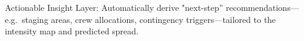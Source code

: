 \documentclass[conference]{IEEEtran}
\begin{document}
Actionable Insight Layer: Automatically derive "next-step'' recommendations—e.g.\ staging areas, crew allocations, contingency triggers—tailored to the intensity map and predicted spread.
















\end{document}
